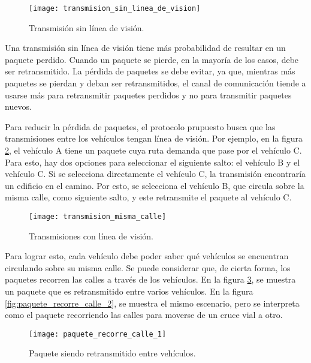 \begin{figure}[th]
\centering
\texttt{[image: transmision\_sin\_linea\_de\_vision]}
\decoRule
\caption[Transmisión sin línea de visión]{Transmisión sin línea de visión.}
\label{fig:transmision_sin_linea_de_vision}
\end{figure}

Una transmisión sin línea de visión tiene más probabilidad de resultar en un
paquete perdido. Cuando un paquete se pierde, en la mayoría de los casos, debe
ser retransmitido. La pérdida de paquetes se debe evitar, ya que, mientras más
paquetes se pierdan y deban ser retransmitidos, el canal de comunicación tiende
a usarse más para retransmitir paquetes perdidos y no para transmitir paquetes
nuevos.

Para reducir la pérdida de paquetes, el protocolo prupuesto busca que las
transmisiones entre los vehículos tengan línea de visión. Por ejemplo, en la
figura \ref{fig:transmision_misma_calle}, el vehículo A tiene un paquete cuya
ruta demanda que pase por el vehículo C. Para esto, hay dos opciones para
seleccionar el siguiente salto: el vehículo B y el vehículo C. Si se selecciona
directamente el vehículo C, la transmisión encontraría un edificio en el
camino. Por esto, se selecciona el vehículo B, que circula sobre la misma
calle, como siguiente salto, y este retransmite el paquete al vehículo C.

\begin{figure}[th]
\centering
\texttt{[image: transmision\_misma\_calle]}
\decoRule
\caption[Transmisiones con línea de visión]{Transmisiones con línea de visión.}
\label{fig:transmision_misma_calle}
\end{figure}

Para lograr esto, cada vehículo debe poder saber qué vehículos se encuentran
circulando sobre su misma calle. Se puede considerar que, de cierta forma, los
paquetes recorren las calles a través de los vehículos. En la figura
\ref{fig:paquete_recorre_calle_1}, se muestra un paquete que es retransmitido
entre varios vehículos. En la figura \ref{fig:paquete_recorre_calle_2}, se
muestra el mismo escenario, pero se interpreta como el paquete recorriendo las
calles para moverse de un cruce vial a otro.

\begin{figure}[th]
\centering
\texttt{[image: paquete\_recorre\_calle\_1]}
\decoRule
\caption[Paquete siendo retransmitido entr vehículos]{Paquete siendo
retransmitido entre vehículos.}
\label{fig:paquete_recorre_calle_1}
\end{figure}

